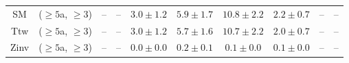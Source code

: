 \begin{table}[h!]
{\begin{tabular}{cccccccccc}
	SM & ($\ge5$a, $\ge3$) & -- & -- & $3.0\pm 1.2$ & $5.9\pm 1.7$ & $10.8\pm 2.2$ & $2.2\pm 0.7$ & -- & -- \\[0.5ex] 
	Ttw & ($\ge5$a, $\ge3$) & -- & -- & $3.0\pm 1.2$ & $5.7\pm 1.6$ & $10.7\pm 2.2$ & $2.0\pm 0.7$ & -- & -- \\[0.5ex] 
	Zinv & ($\ge5$a, $\ge3$) & -- & -- & $0.0\pm 0.0$ & $0.2\pm 0.1$ & $0.1\pm 0.0$ & $0.1\pm 0.0$ & -- & -- \\[0.5ex] 
	\hline
	\hline
\end{tabular}}
\end{table}
